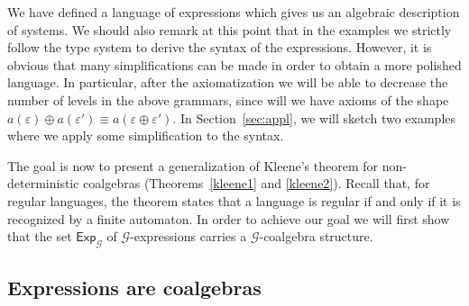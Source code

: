 \documentclass{LMCS}
\newcommand\E\varepsilon
\newcommand\Exp{\mathsf{Exp}}
\newcommand\G{\mathcal{G}}
\def\hyph{-\penalty0\hskip0pt\relax}
\theoremstyle{definition}
\theoremstyle{plain}
\theoremstyle{plain}
\theoremstyle{plain}
\theoremstyle{plain}
\theoremstyle{definition}
\theoremstyle{definition}
\begin{document}
We have defined a language of expressions which gives us an
algebraic description of systems.  We should also remark at this point 
that in the examples we strictly follow the type system to derive the 
syntax of the expressions. However, it is obvious that many 
simplifications can be made in
order to obtain a more polished language. In particular, after the
axiomatization we will be able to decrease the number of levels in the
above grammars, since will we have axioms of the shape $a(\E)\oplus
a(\E') \equiv a(\E\oplus \E')$. In Section~\ref{sec:appl}, we will
sketch two examples where we apply some simplification to the syntax. 

The goal is now to present a generalization 
of Kleene's theorem for non\hyph deterministic coalgebras (Theorems~\ref{kleene1} and \ref{kleene2}). Recall that, for regular languages, the theorem states that a language is regular
if and only if it is recognized by a finite automaton. In order to
achieve our goal we will first show that the set $\Exp_\G$ of
$\G$-expressions carries a $\G$-coalgebra structure. 

\subsection{Expressions are coalgebras}\label{sec:expressions_coalg}
\end{document}
